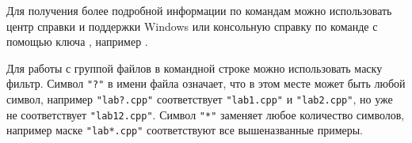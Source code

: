 \documentclass[a4paper,12pt]{article}
\begin{document}
    \begin{flushleft}
        Для получения более подробной информации по командам можно использовать центр справки и поддержки Windows или консольную справку по команде с помощью ключа , например .
    \end{flushleft}
  
    \begin{flushleft}
        Для работы с группой файлов в командной строке можно использовать маску фильтр. Символ \texttt{"?"} в имени файла означает, что в этом месте может быть любой символ, например \texttt{"lab?.cpp"} соответствует \texttt{"lab1.cpp"} и \texttt{"lab2.cpp"}, но уже не соответствует \texttt{"lab12.cpp"}. Символ \texttt{"*"} заменяет любое количество символов, например маске \texttt{"lab*.cpp"} соответствуют все вышеназванные примеры.
    \end{flushleft}

    \newpage
\end{document}
